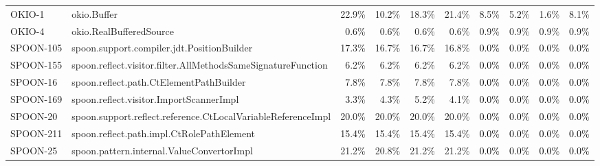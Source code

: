 \begin{tabular}{ ll rrrr rrrr}
OKIO-1  &  okio.Buffer & 22.9\% & 10.2\% & 18.3\% & 21.4\% & 8.5\% & 5.2\% & 1.6\% & 8.1\%\\ 
OKIO-4  &  okio.RealBufferedSource & 0.6\% & 0.6\% & 0.6\% & 0.6\% & 0.9\% & 0.9\% & 0.9\% & 0.9\%\\ 
SPOON-105  &  spoon.support.compiler.jdt.PositionBuilder & 17.3\% & 16.7\% & 16.7\% & 16.8\% & \cellcolor{light-gray} \textcolor{black}{0.0\%} & \cellcolor{light-gray} \textcolor{black}{0.0\%} & \cellcolor{light-gray} \textcolor{black}{0.0\%} & \cellcolor{light-gray} \textcolor{black}{0.0\%}\\ 
SPOON-155  &  spoon.reflect.visitor.filter.AllMethodsSameSignatureFunction & 6.2\% & 6.2\% & 6.2\% & 6.2\% & \cellcolor{light-gray} \textcolor{black}{0.0\%} & \cellcolor{light-gray} \textcolor{black}{0.0\%} & \cellcolor{light-gray} \textcolor{black}{0.0\%} & \cellcolor{light-gray} \textcolor{black}{0.0\%}\\ 
SPOON-16  &  spoon.reflect.path.CtElementPathBuilder & 7.8\% & 7.8\% & 7.8\% & 7.8\% & \cellcolor{light-gray} \textcolor{black}{0.0\%} & \cellcolor{light-gray} \textcolor{black}{0.0\%} & \cellcolor{light-gray} \textcolor{black}{0.0\%} & \cellcolor{light-gray} \textcolor{black}{0.0\%}\\ 
SPOON-169  &  spoon.reflect.visitor.ImportScannerImpl & 3.3\% & 4.3\% & 5.2\% & 4.1\% & \cellcolor{light-gray} \textcolor{black}{0.0\%} & \cellcolor{light-gray} \textcolor{black}{0.0\%} & \cellcolor{light-gray} \textcolor{black}{0.0\%} & \cellcolor{light-gray} \textcolor{black}{0.0\%}\\ 
SPOON-20  &  spoon.support.reflect.reference.CtLocalVariableReferenceImpl & 20.0\% & 20.0\% & 20.0\% & 20.0\% & \cellcolor{light-gray} \textcolor{black}{0.0\%} & \cellcolor{light-gray} \textcolor{black}{0.0\%} & \cellcolor{light-gray} \textcolor{black}{0.0\%} & \cellcolor{light-gray} \textcolor{black}{0.0\%}\\ 
SPOON-211  &  spoon.reflect.path.impl.CtRolePathElement & 15.4\% & 15.4\% & 15.4\% & 15.4\% & \cellcolor{light-gray} \textcolor{black}{0.0\%} & \cellcolor{light-gray} \textcolor{black}{0.0\%} & \cellcolor{light-gray} \textcolor{black}{0.0\%} & \cellcolor{light-gray} \textcolor{black}{0.0\%}\\ 
SPOON-25  &  spoon.pattern.internal.ValueConvertorImpl & 21.2\% & 20.8\% & 21.2\% & 21.2\% & \cellcolor{light-gray} \textcolor{black}{0.0\%} & \cellcolor{light-gray} \textcolor{black}{0.0\%} & \cellcolor{light-gray} \textcolor{black}{0.0\%} & \cellcolor{light-gray} \textcolor{black}{0.0\%}\\ 

\end{tabular}

